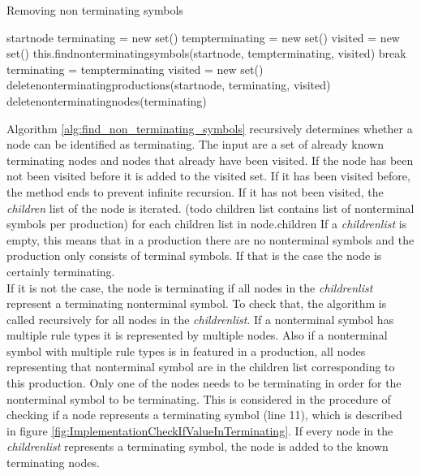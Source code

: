 \begin{algorithm}[H]
\caption{Removing non terminating symbols}
\begin{algorithmic}[1] 
\Require start\textunderscore node
\State terminating = new set()
\State temp\textunderscore terminating = new set()
	\State visited = new set()
	\State this.find\textunderscore non\textunderscore terminating\textunderscore symbols(start\textunderscore node, temp\textunderscore terminating, visited)
		\State break
	\Else
		\State terminating = temp\textunderscore terminating
	\EndIf
\EndWhile
\State visited = new set() 
\State delete\textunderscore non\textunderscore terminating\textunderscore productions(start\textunderscore node, terminating, visited)
\State delete\textunderscore non\textunderscore terminating\textunderscore nodes(terminating)
\end{algorithmic}
\label{alg:remove_non_terminating_symbols}
\end{algorithm}


Algorithm \ref{alg:find_non_terminating_symbols}  recursively determines whether a node can be identified as terminating.
The input are a set of already known terminating nodes and nodes that already have been visited.
If the node has been not been visited before it is added to the visited set.
If it has been visited before, the method ends to prevent infinite recursion.
If it has not been visited, the \textit{children} list of the node is iterated. (todo children list contains list of nonterminal symbols per production)
for each children list in node.children
If a \textit{children\textunderscore list} is empty, this means that in a production there are no nonterminal symbols and the production only consists of terminal symbols. If that is the case the node is certainly terminating.\\
If it is not the case, the node is terminating if all nodes in the \textit{children\textunderscore list} represent a terminating nonterminal symbol.
To check that, the algorithm is called recursively for all nodes in the \textit{children\textunderscore list}.
If a nonterminal symbol has multiple rule types it is represented by multiple nodes. Also if a nonterminal symbol with multiple rule types is in featured in a production, all nodes representing that nonterminal symbol are in the children list corresponding to this production. Only one of the nodes needs to be terminating in order for the nonterminal symbol to be terminating.
This is considered in the procedure of checking if a node represents a terminating symbol (line 11), which is described in figure \ref{fig:ImplementationCheckIfValueInTerminating}.
If every node in the \textit{children\textunderscore list} represents a terminating symbol, the node is added to the known terminating nodes.

